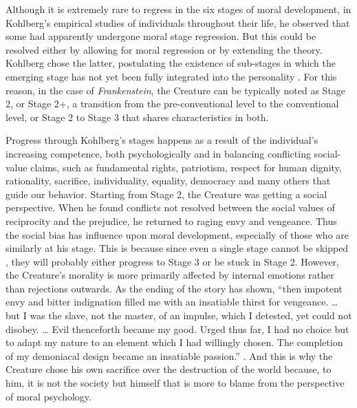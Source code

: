 \begin{text}

Although it is extremely rare to regress in the six stages of moral development, in Kohlberg's empirical studies of individuals throughout their life, he observed that some had apparently undergone moral stage regression. But this could be resolved either by allowing for moral regression or by extending the theory. Kohlberg chose the latter, postulating the existence of sub-stages in which the emerging stage has not yet been fully integrated into the personality \citep{kohlberg1976moral}. For this reason, in the case of \textit{Frankenstein}, the Creature can be typically noted as Stage 2\textonehalf{}, or Stage 2+, a transition from the pre-conventional level to the conventional level, or Stage 2 to Stage 3 that shares characteristics in both.

Progress through Kohlberg's stages happens as a result of the individual's increasing competence, both psychologically and in balancing conflicting social-value claims, such as fundamental rights, patriotism, respect for human dignity, rationality, sacrifice, individuality, equality, democracy and many others that guide our behavior. Starting from Stage 2, the Creature was getting a social perspective. When he found conflicts not resolved between the social values of reciprocity and the prejudice, he returned to raging envy and vengeance. Thus the social bias has influence upon moral development, especially of those who are similarly at his stage. This is because since even a single stage cannot be skipped \citep{ wiki:kohlberg}, they will probably either progress to Stage 3 or be stuck in Stage 2\textonehalf. However, the Creature's morality is more primarily affected by internal emotions rather than rejections outwards. As the ending of the story has shown, ``then impotent envy and bitter indignation filled me with an insatiable thirst for vengeance. \dots{} but I was the slave, not the master, of an impulse, which I detested, yet could not disobey. \dots{} Evil thenceforth became my good. Urged thus far, I had no choice but to adapt my nature to an element which I had willingly chosen. The completion of my demoniacal design became an insatiable passion.'' . And this is why the Creature chose his own sacrifice over the destruction of the world because, to him, it is not the society but himself that is more to blame from the perspective of moral psychology.


\end{text}
